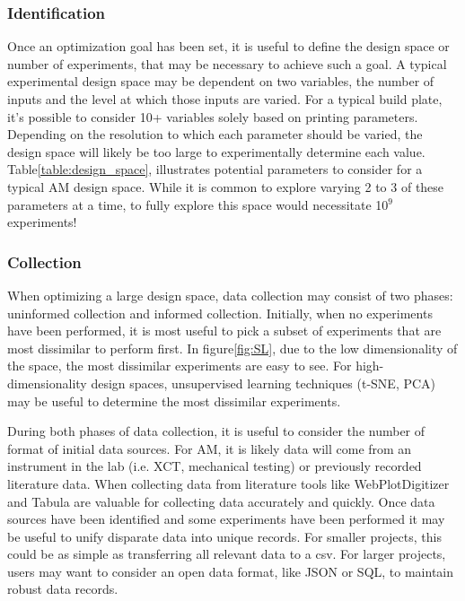 \subsubsection{Identification}
Once an optimization goal has been set, it is useful to define the design space or number of experiments, that may be necessary to achieve such a goal.
A typical experimental design space may be dependent on two variables, the number of inputs and the level at which those inputs are varied.
For a typical build plate, it's possible to consider 10+ variables solely based on printing parameters.
Depending on the resolution to which each parameter should be varied, the design space will likely be too large to experimentally determine each value.
Table\ref{table:design_space}, illustrates potential parameters to consider for a typical AM design space.
While it is common to explore varying 2 to 3 of these parameters at a time, to fully explore this space would necessitate 10$^9$ experiments!

\subsubsection{Collection}
When optimizing a large design space, data collection may consist of two phases: uninformed collection and informed collection.
Initially, when no experiments have been performed, it is most useful to pick a subset of experiments that are most dissimilar to perform first.
In figure\ref{fig:SL}, due to the low dimensionality of the space, the most dissimilar experiments are easy to see.
For high-dimensionality design spaces, unsupervised learning techniques (t-SNE, PCA) may be useful to determine the most dissimilar experiments.

During both phases of data collection, it is useful to consider the number of format of initial data sources.
For AM, it is likely data will come from an instrument in the lab (i.e. XCT, mechanical testing) or previously recorded literature data.
When collecting data from literature tools like WebPlotDigitizer and Tabula are valuable for collecting data accurately and quickly.
Once data sources have been identified and some experiments have been performed it may be useful to unify disparate data into unique records.
For smaller projects, this could be as simple as transferring all relevant data to a csv.
For larger projects, users may want to consider an open data format, like JSON or SQL, to maintain robust data records.

